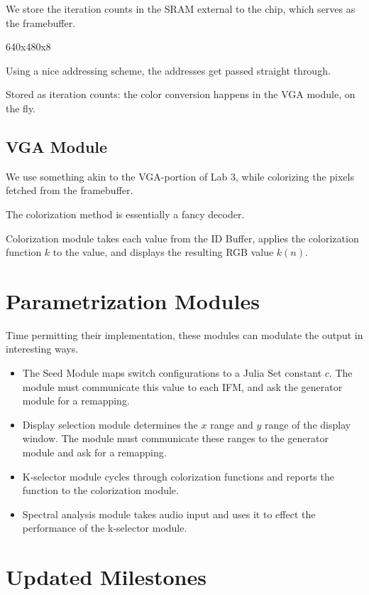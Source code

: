 \documentclass{article}
\begin{document}
We store the iteration counts in the SRAM external to the chip, which
serves as the framebuffer. 

640x480x8

Using a nice addressing scheme, the addresses get passed straight through.

Stored as iteration counts: the color conversion happens in the VGA
module, on the fly.


\subsection{VGA Module}

We use something akin to the VGA-portion of Lab 3, while colorizing
the pixels fetched from the framebuffer.

The colorization method is essentially a fancy decoder.

Colorization module takes each value from the ID Buffer, applies the
colorization function $k$ to the value, and displays the resulting RGB
value $k(n)$.


\section{Parametrization Modules}

Time permitting their implementation, these modules can modulate the
output in interesting ways.

\begin{itemize}
\item The Seed Module maps switch configurations to a Julia Set
  constant $c$. The module must communicate this value to each IFM, and
  ask the generator module for a remapping.
\item Display selection module determines the $x$ range and $y$ range of
  the display window.  The module must communicate these ranges to the
  generator module and ask for a remapping.
\item K-selector module cycles through colorization functions and
  reports the function to the colorization module.
\item Spectral analysis module takes audio input and uses it to effect
  the performance of the k-selector module.
\end{itemize}


\section{Updated Milestones}
\end{document}
